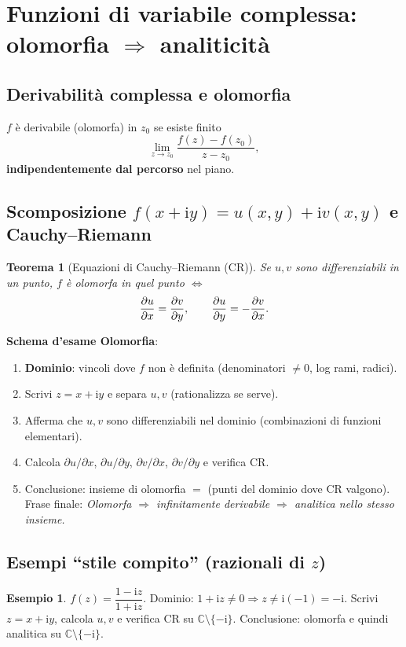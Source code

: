 \documentclass[11pt,a4paper]{article}
\newcommand{\C}{\mathbb{C}}
\newcommand{\ii}{\mathrm{i}}
\newtheorem{theorem}{Teorema}
\theoremstyle{definition}
\newtheorem{example}{Esempio}
\begin{document}
\section{Funzioni di variabile complessa: olomorfia $\Rightarrow$ analiticità}

\subsection{Derivabilità complessa e olomorfia}
\begin{defbox}
$f$ è derivabile (olomorfa) in $z_0$ se esiste finito
\[
\lim_{z\to z_0}\frac{f(z)-f(z_0)}{z-z_0},
\]
\textbf{indipendentemente dal percorso} nel piano.
\end{defbox}

\subsection{Scomposizione $f(x+\ii y)=u(x,y)+\ii v(x,y)$ e Cauchy–Riemann}
\begin{theorem}[Equazioni di Cauchy–Riemann (CR)]
Se $u,v$ sono differenziabili in un punto, $f$ è olomorfa in quel punto $\iff$
\[
\pdv{u}{x}=\pdv{v}{y},\qquad \pdv{u}{y}=-\pdv{v}{x}.
\]
\end{theorem}

\begin{exambox}
\textbf{Schema d’esame Olomorfia}:
\begin{enumerate}[(1)]
\item \textbf{Dominio}: vincoli dove $f$ non è definita (denominatori $\neq0$, log rami, radici).
\item Scrivi $z=x+\ii y$ e separa $u,v$ (rationalizza se serve).
\item Afferma che $u,v$ sono differenziabili nel dominio (combinazioni di funzioni elementari).
\item Calcola $\partial u/\partial x$, $\partial u/\partial y$, $\partial v/\partial x$, $\partial v/\partial y$ e verifica CR.
\item Conclusione: insieme di olomorfia $=$ (punti del dominio dove CR valgono).\\
Frase finale: \emph{Olomorfa $\Rightarrow$ infinitamente derivabile $\Rightarrow$ analitica nello stesso insieme.}
\end{enumerate}
\end{exambox}

\subsection{Esempi “stile compito” (razionali di $z$)}
\begin{example}
$f(z)=\dfrac{1-\ii z}{1+\ii z}$. \;
Dominio: $1+\ii z\neq 0\Rightarrow z\neq \ii(-1)=-\ii$. 
Scrivi $z=x+\ii y$, calcola $u,v$ e verifica CR su $\C\setminus\{-\ii\}$. 
Conclusione: olomorfa e quindi analitica su $\C\setminus\{-\ii\}$.
\end{example}
\end{document}
